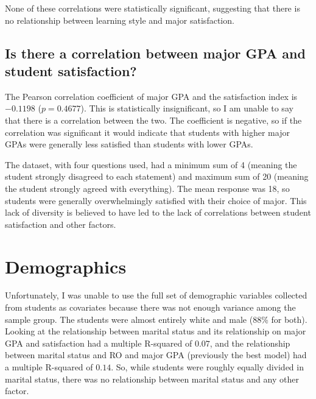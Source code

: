 None of these correlations were statistically significant, suggesting that there is no relationship between learning style and major satisfaction.

\subsection{Is there a correlation between major GPA and student satisfaction?}
The Pearson correlation coefficient of major GPA and the satisfaction index is $-0.1198$ ($p=0.4677$). This is statistically insignificant, so I am unable to say that there is a correlation between the two. The coefficient is negative, so if the correlation was significant it would indicate that students with higher major GPAs were generally less satisfied than students with lower GPAs.

The dataset, with four questions used, had a minimum sum of 4 (meaning the student strongly disagreed to each statement) and maximum sum of 20 (meaning the student strongly agreed with everything). The mean response was 18, so students were generally overwhelmingly satisfied with their choice of major. This lack of diversity is believed to have led to the lack of correlations between student satisfaction and other factors.

\section{Demographics}
Unfortunately, I was unable to use the full set of demographic variables collected from students as covariates because there was not enough variance among the sample group. The students were almost entirely white and male (88\% for both). Looking at the relationship between marital status and its relationship on major GPA and satisfaction had a multiple R-squared of $0.07$, and the relationship between marital status and RO and major GPA (previously the best model) had a multiple R-squared of $0.14$. So, while students were roughly equally divided in marital status, there was no relationship between marital status and any other factor.
